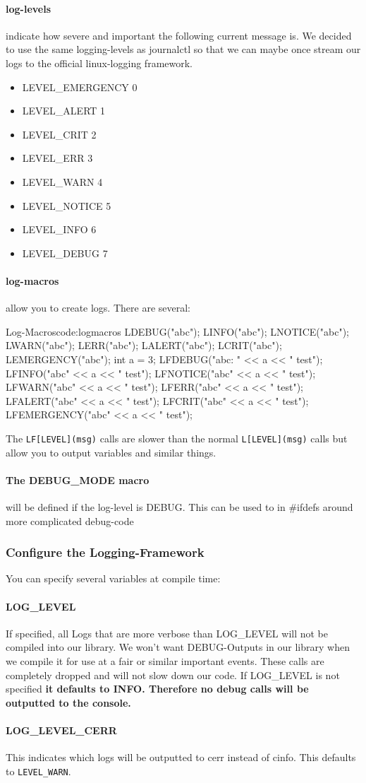 \documentclass[12pt,a4paper]{article}
\begin{document}
\paragraph{log-levels} indicate how severe and important the following
current message is. We decided to use the same logging-levels as journalctl so that
we can maybe once stream our logs to the official linux-logging 
framework. 
\begin{itemize}
    \item LEVEL\_EMERGENCY 0
    \item LEVEL\_ALERT 1
    \item LEVEL\_CRIT 2
    \item LEVEL\_ERR 3
    \item LEVEL\_WARN 4
    \item LEVEL\_NOTICE 5
    \item LEVEL\_INFO 6
    \item LEVEL\_DEBUG 7
\end{itemize}
\paragraph{log-macros} allow you to create logs. 
There are several:
\begin{duckc++}{Log-Macros}{code:logmacros}
    LDEBUG("abc");
    LINFO("abc");
    LNOTICE("abc");
    LWARN("abc");
    LERR("abc");
    LALERT("abc");
    LCRIT("abc");
    LEMERGENCY("abc");
    int a = 3;
    LFDEBUG("abc: " << a << " test");
    LFINFO("abc" << a << " test");
    LFNOTICE("abc" << a << " test");
    LFWARN("abc" << a << " test");
    LFERR("abc" << a << " test");
    LFALERT("abc" << a << " test");
    LFCRIT("abc" << a << " test");
    LFEMERGENCY("abc" << a << " test");
\end{duckc++}
The \texttt{LF[LEVEL](msg)} calls are slower than the normal \texttt{L[LEVEL](msg)} calls
but allow you to output variables and similar things.
\paragraph{The DEBUG\_MODE macro} will be defined if the 
log-level is DEBUG. This can be used to in \#ifdefs around more
complicated debug-code
\subsubsection{Configure the Logging-Framework}
You can specify several variables at compile time:
\paragraph{LOG\_LEVEL}
If specified, all Logs that are more verbose than LOG\_LEVEL will not be
compiled into our library. We won't want DEBUG-Outputs in our library
when we compile it for use at a fair or similar important events. 
These calls are completely dropped and will not slow down our code.
If LOG\_LEVEL is not specified \textbf{it defaults to INFO. Therefore 
no debug calls will be outputted to the console.}
\paragraph{LOG\_LEVEL\_CERR} 
This indicates which logs will be outputted to cerr instead of cinfo.
This defaults to \texttt{LEVEL\_WARN}.
\end{document}
